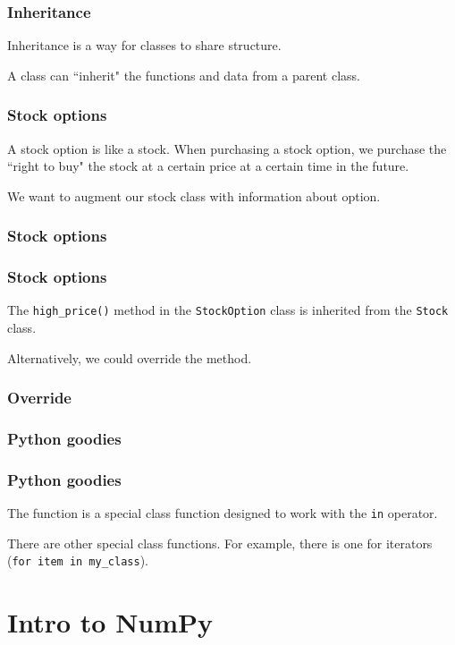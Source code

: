 \documentclass{beamer}
\begin{document}
\begin{frame}
\frametitle{Inheritance}
Inheritance is a way for classes to share structure.

\vspace{0.2in}
A class can ``inherit" the functions and data from a parent class.
\end{frame}

\begin{frame}
\frametitle{Stock options}
A stock option is like a stock.  When purchasing a stock option, we purchase the ``right to buy" the stock at a certain price at a certain time in the future.

\vspace{0.2in}
We want to augment our stock class with information about option.
\end{frame}

\begin{frame}
\frametitle{Stock options}
\end{frame}

\begin{frame}
\frametitle{Stock options}
The \texttt{high\_price()} method in the \texttt{StockOption} class is inherited from the \texttt{Stock} class.

\vspace{0.2in}
Alternatively, we could override the method.
\end{frame}

\begin{frame}
\frametitle{Override}
\end{frame}

\begin{frame}
\frametitle{Python goodies}
\end{frame}

\begin{frame}
\frametitle{Python goodies}
The  function is a special class function designed to work with the \texttt{in} operator.

\vspace{0.2in}

There are other special class functions.  For example, there is one for iterators (\texttt{for item in my\_class}).

\end{frame}


\section{Intro to NumPy}
\end{document}
